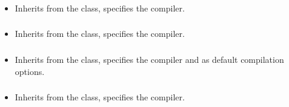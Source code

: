 \subsubsection*{}\label{subsec:CompileC}

\begin{itemize}[label={}]
    \item Inherits from the \hyperref[subsec:CompileBase]{} class, specifies the 
          compiler.
\end{itemize}

\subsubsection*{}\label{subsec:CompileCpp}

\begin{itemize}[label={}]
    \item Inherits from the \hyperref[subsec:CompileBase]{} class, specifies the 
          compiler.
\end{itemize}

\subsubsection*{}\label{subsec:CompileCSharp}

\begin{itemize}[label={}]
    \item Inherits from the \hyperref[subsec:CompileBase]{} class, specifies the 
          compiler and  as default compilation options.
\end{itemize}

\subsubsection*{}\label{subsec:CompileGo}

\begin{itemize}[label={}]
    \item Inherits from the \hyperref[subsec:CompileBase]{} class, specifies the 
          compiler.
\end{itemize}

\subsubsection*{}\label{subsec:CompileHaskell}

